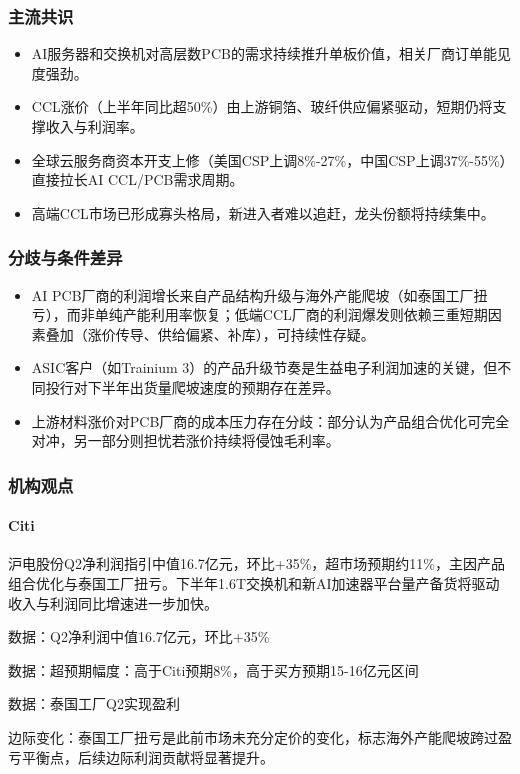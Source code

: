 \documentclass[11pt]{ctexart}
\begin{document}
\subsubsection*{主流共识}
\begin{itemize}
  \item AI服务器和交换机对高层数PCB的需求持续推升单板价值，相关厂商订单能见度强劲。
  \item CCL涨价（上半年同比超50\%）由上游铜箔、玻纤供应偏紧驱动，短期仍将支撑收入与利润率。
  \item 全球云服务商资本开支上修（美国CSP上调8\%-27\%，中国CSP上调37\%-55\%）直接拉长AI CCL/PCB需求周期。
  \item 高端CCL市场已形成寡头格局，新进入者难以追赶，龙头份额将持续集中。
\end{itemize}
\subsubsection*{分歧与条件差异}
\begin{itemize}
  \item AI PCB厂商的利润增长来自产品结构升级与海外产能爬坡（如泰国工厂扭亏），而非单纯产能利用率恢复；低端CCL厂商的利润爆发则依赖三重短期因素叠加（涨价传导、供给偏紧、补库），可持续性存疑。
  \item ASIC客户（如Trainium 3）的产品升级节奏是生益电子利润加速的关键，但不同投行对下半年出货量爬坡速度的预期存在差异。
  \item 上游材料涨价对PCB厂商的成本压力存在分歧：部分认为产品组合优化可完全对冲，另一部分则担忧若涨价持续将侵蚀毛利率。
\end{itemize}
\subsubsection*{机构观点}
\paragraph{Citi} 沪电股份Q2净利润指引中值16.7亿元，环比+35\%，超市场预期约11\%，主因产品组合优化与泰国工厂扭亏。下半年1.6T交换机和新AI加速器平台量产备货将驱动收入与利润同比增速进一步加快。
{\small\color{refgray}数据：Q2净利润中值16.7亿元，环比+35\%\par}
{\small\color{refgray}数据：超预期幅度：高于Citi预期8\%，高于买方预期15-16亿元区间\par}
{\small\color{refgray}数据：泰国工厂Q2实现盈利\par}
{\small\color{refgray}边际变化：泰国工厂扭亏是此前市场未充分定价的变化，标志海外产能爬坡跨过盈亏平衡点，后续边际利润贡献将显著提升。\par}
\end{document}

